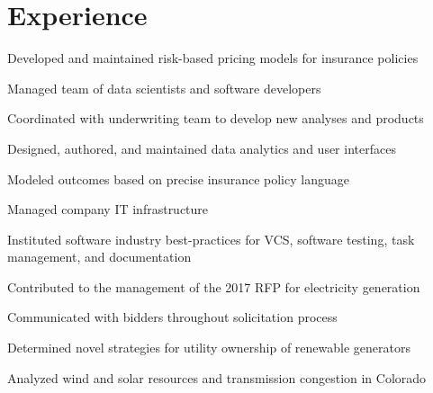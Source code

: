 \documentclass[]{deedy-resume-openfont}
\begin{document}
\begin{minipage}[t]{0.66\textwidth}


\section{Experience}

	\vspace{\topsep}
	\begin{tightemize}
	\item Developed and maintained risk-based pricing models for insurance policies
	\item Managed team of data scientists and software developers
	\item Coordinated with underwriting team to develop new analyses and products
	\item Designed, authored, and maintained data analytics and user interfaces
	\item Modeled outcomes based on precise insurance policy language
	\item Managed company IT infrastructure
	\item Instituted software industry best-practices for VCS, software testing, task management, and documentation 
	\end{tightemize}
	\sectionsep

\begin{tightemize}
\item Contributed to the management of the 2017 RFP for electricity generation
\item Communicated with bidders throughout solicitation process
\item Determined novel strategies for utility ownership of renewable generators
\item Analyzed wind and solar resources and transmission congestion in Colorado
\end{tightemize}
\sectionsep


\end{minipage}
\end{document}
